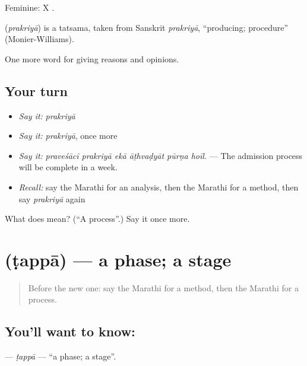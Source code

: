 Feminine: X  .

\begin{cousinweb}
\textbf{} (\emph{prakriyā}) is a tatsama, taken from Sanskrit \emph{prakriyā}, \textquotedblleft{}producing; procedure\textquotedblright{} (Monier-Williams).
\end{cousinweb}

\begin{grammarlens}[title={What you've built}]
One more word for giving reasons and opinions.
\end{grammarlens}

\subsection*{Your turn}
\begin{itemize}
\raggedright
  \item \emph{Say it:} \emph{prakriyā}
  \item \emph{Say it:} \emph{prakriyā}, once more
  \item \emph{Say it:} \emph{praveśācī prakriyā ekā āṭhvaḍyāt pūrṇa hoīl.} — The admission process will be complete in a week.
  \item \emph{Recall:} say the Marathi for an analysis, then the Marathi for a method, then say \emph{prakriyā} again
\end{itemize}

\begin{tcolorbox}[breakable,colback=teal!4,colframe=teal!35!black,title={Before you move on}]
What does  mean? (\textquotedblleft{}A process\textquotedblright{}.) Say it once more.
\end{tcolorbox}
\section[\texorpdfstring{\mr{टप्पा} (ṭappā)}{टप्पा (ṭappā)}]{ (ṭappā) — a phase; a stage}

\label{lesson:MR-C374-tappa}



\begin{quote}
Before the new one: say the Marathi for a method, then the Marathi for a process.
\end{quote}

\subsection*{You'll want to know: }
\textbf{} — \emph{ṭappā} — \textquotedblleft{}a phase; a stage\textquotedblright{}.

